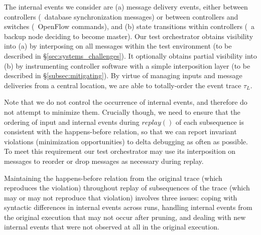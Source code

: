The internal events we consider are
(a) message delivery events, either between controllers (\eg~database
synchronization messages) or
between controllers and switches (\eg~OpenFlow commands), and (b) state transitions
within controllers (\eg~a backup node deciding to become master).
Our test orchestrator obtains visibility into (a) by interposing on all messages within the test
environment (to be described in \S\ref{sec:systems_challenges}).
It optionally obtains partial visibility into (b) by instrumenting controller
software with a simple interposition layer (to be described in \S\ref{subsec:mitigating}).
By virtue of managing inputs and message deliveries from a central location, we are
able to totally-order the event trace $\tau_L$.

Note that we do not control the occurrence of internal events, and therefore do
not attempt to minimize them. Crucially though, we need to ensure that the ordering
of input and internal events during
$replay()$ of each subsequence is consistent with the happens-before relation,
so that we can report invariant violations
(minimization opportunities) to delta debugging as often as possible.
To meet this requirement our test orchestrator may use its interposition on
messages to reorder or drop messages as necessary during replay.


Maintaining the happens-before relation from the original trace
(which reproduces the violation) throughout replay of subsequences of the
trace (which may or may not reproduce that
violation) involves three issues: coping with syntactic differences in internal
events across runs,
handling internal events from the original
execution that may not occur after pruning, and dealing with new internal events that were not
observed at all in the original execution.

